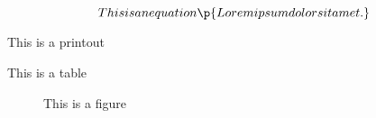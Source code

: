 \begin{equation}{This is an equation}
\p{Lorem ipsum dolor sit amet.}
\end{equation}

\begin{printout}{This is a printout}
\end{printout}

\begin{table}{This is a table}
\end{table}

\begin{figure}{This is a figure}
\end{figure}

\begin{verse}
\end{verse}

